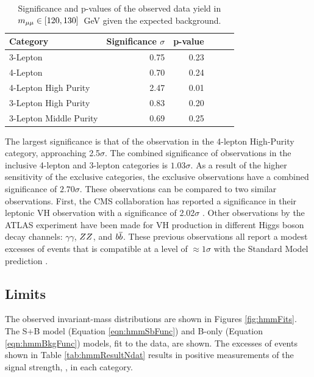 \begin{table}[htp]
\caption{Significance and p-values of the observed data yield in $m_{\mu\mu}\in[120,130]$~GeV given the expected background.}
\begin{center}
\begin{tabular}{l r r r r r}\toprule
Category & Significance $\sigma$ & p-value \\
\midrule
3-Lepton & 0.75 & 0.23 \\
4-Lepton & 0.70 & 0.24 \\
\midrule
4-Lepton High Purity & 2.47 & 0.01 \\
3-Lepton High Purity & 0.83 & 0.20 \\
3-Lepton Middle Purity & 0.69 & 0.25 \\
\bottomrule\end{tabular} %
\label{tab:hmmSignificance}
\end{center}
\end{table}

The largest significance is that of the observation in the 4-lepton High-Purity category, approaching 2.5$\sigma$.
The combined significance of observations in the inclusive 4-lepton and 3-lepton categories is $1.03\sigma$.
As a result of the higher sensitivity of the exclusive categories, the exclusive observations have a combined significance of $2.70\sigma$.
These observations can be compared to two similar observations.
First, the CMS collaboration has reported a significance in their leptonic VH \hmm observation with a significance of 2.02$\sigma$ \cite{cmsHmm}.
Other observations by the ATLAS experiment have been made for VH production in different Higgs boson decay channels: $\gamma\gamma$, $ZZ$, and $b\overline{b}$.
These previous observations all report a modest excesses of events that is compatible at a level of $\approx1\sigma$ with the Standard Model prediction \cite{atlashiggs}.


\subsection{Limits}

The observed invariant-mass distributions are shown in Figures \ref{fig:hmmFits}.
The S+B model (Equation \ref{eqn:hmmSbFunc}) and B-only (Equation \ref{eqn:hmmBkgFunc}) models, fit to the data, are shown.
The excesses of events shown in Table \ref{tab:hmmResultNdat} results in positive measurements of the signal strength, \mus, in each category.


